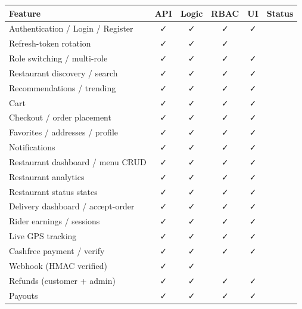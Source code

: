 \documentclass[11pt,a4paper]{article}
\newcommand{\bcomplete}{\badge[ok]{COMPLETE}}
\newcommand{\yes}{\textcolor{ok}{\faCheck}}
\newcommand{\na}{\textcolor{muted}{\textemdash}}
\newcommand{\th}[1]{\textbf{\color{white}#1}}
\begin{document}
\begin{center}\footnotesize
\begin{longtable}{p{4.3cm}cccc p{2.1cm}}
\toprule
\rowcolor{headbg}\th{Feature} & \th{API} & \th{Logic} & \th{RBAC} & \th{UI} & \th{Status} \\
\midrule
\endhead
Authentication / Login / Register & \yes & \yes & \yes & \yes & \bcomplete \\
\rowcolor{rowalt}Refresh-token rotation        & \yes & \yes & \yes & \na  & \bcomplete \\
Role switching / multi-role       & \yes & \yes & \yes & \yes & \bcomplete \\
Restaurant discovery / search     & \yes & \yes & \yes & \yes & \bcomplete \\
Recommendations / trending        & \yes & \yes & \yes & \yes & \bcomplete \\
\rowcolor{rowalt}Cart                          & \yes & \yes & \yes & \yes & \bcomplete \\
Checkout / order placement        & \yes & \yes & \yes & \yes & \bcomplete \\
Favorites / addresses / profile   & \yes & \yes & \yes & \yes & \bcomplete \\
\rowcolor{rowalt}Notifications                 & \yes & \yes & \yes & \yes & \bcomplete \\
Restaurant dashboard / menu CRUD  & \yes & \yes & \yes & \yes & \bcomplete \\
Restaurant analytics              & \yes & \yes & \yes & \yes & \bcomplete \\
\rowcolor{rowalt}Restaurant status states      & \yes & \yes & \yes & \yes & \bcomplete \\
Delivery dashboard / accept-order & \yes & \yes & \yes & \yes & \bcomplete \\
Rider earnings / sessions         & \yes & \yes & \yes & \yes & \bcomplete \\
\rowcolor{rowalt}Live GPS tracking             & \yes & \yes & \yes & \yes & \bcomplete \\
Cashfree payment / verify         & \yes & \yes & \yes & \yes & \bcomplete \\
Webhook (HMAC verified)           & \yes & \yes & \na  & \na  & \bcomplete \\
\rowcolor{rowalt}Refunds (customer + admin)    & \yes & \yes & \yes & \yes & \bcomplete \\
Payouts                           & \yes & \yes & \yes & \yes & \bcomplete \\

\end{longtable}
\end{center}
\end{document}
